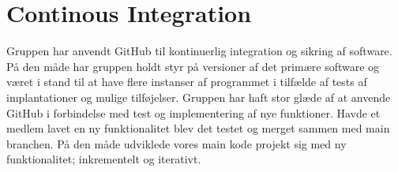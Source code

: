 \section{Continous Integration}\label{sec:contintegration}
Gruppen har anvendt GitHub til kontinuerlig integration og sikring af software. 
På den måde har gruppen holdt styr på versioner af det primære software 
og været i stand til at have flere instanser af programmet 
i tilfælde af tests af implantationer og mulige tilføjelser. 
Gruppen har haft stor glæde af at anvende GitHub i forbindelse med 
test og implementering af nye funktioner. 
Havde et medlem lavet en ny funktionalitet blev det testet og merget sammen med main branchen. 
På den måde udviklede vores main kode projekt sig med ny funktionalitet; inkrementelt og iterativt. 